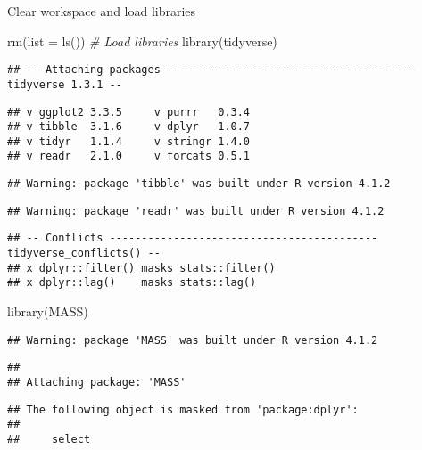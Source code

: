 \documentclass[
]{article}
\author{}
\date{\vspace{-2.5em}}
\newenvironment{Shaded}{\begin{snugshade}}{\end{snugshade}}
\newcommand{\AttributeTok}[1]{\textcolor[rgb]{0.77,0.63,0.00}{#1}}
\newcommand{\CommentTok}[1]{\textcolor[rgb]{0.56,0.35,0.01}{\textit{#1}}}
\newcommand{\FunctionTok}[1]{\textcolor[rgb]{0.00,0.00,0.00}{#1}}
\newcommand{\NormalTok}[1]{#1}
\begin{document}
Clear workspace and load libraries

\begin{Shaded}
\begin{Highlighting}[]
\FunctionTok{rm}\NormalTok{(}\AttributeTok{list =} \FunctionTok{ls}\NormalTok{())}
\CommentTok{\# Load libraries}
\FunctionTok{library}\NormalTok{(tidyverse)}
\end{Highlighting}
\end{Shaded}

\begin{verbatim}
## -- Attaching packages --------------------------------------- tidyverse 1.3.1 --
\end{verbatim}

\begin{verbatim}
## v ggplot2 3.3.5     v purrr   0.3.4
## v tibble  3.1.6     v dplyr   1.0.7
## v tidyr   1.1.4     v stringr 1.4.0
## v readr   2.1.0     v forcats 0.5.1
\end{verbatim}

\begin{verbatim}
## Warning: package 'tibble' was built under R version 4.1.2
\end{verbatim}

\begin{verbatim}
## Warning: package 'readr' was built under R version 4.1.2
\end{verbatim}

\begin{verbatim}
## -- Conflicts ------------------------------------------ tidyverse_conflicts() --
## x dplyr::filter() masks stats::filter()
## x dplyr::lag()    masks stats::lag()
\end{verbatim}

\begin{Shaded}
\begin{Highlighting}[]
\FunctionTok{library}\NormalTok{(MASS)}
\end{Highlighting}
\end{Shaded}

\begin{verbatim}
## Warning: package 'MASS' was built under R version 4.1.2
\end{verbatim}

\begin{verbatim}
## 
## Attaching package: 'MASS'
\end{verbatim}

\begin{verbatim}
## The following object is masked from 'package:dplyr':
## 
##     select
\end{verbatim}
\end{document}
